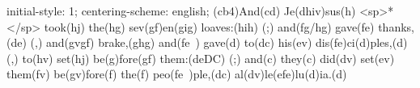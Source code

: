 initial-style: 1;
centering-scheme: english;
(cb4)And(cd) Je(dhiv)sus(h) <sp>*</sp> took(hj) the(hg) sev(gf)en(gig) loaves:(hih) (;) and(fg/hg) gave(fe) thanks,(de) (,) and(gvgf) brake,(ghg) and(fe~) gave(d) to(dc) his(ev) dis(fe)ci(d)ples,(d) (,) to(hv) set(hj) be(g)fore(gf) them:(deDC) (;) and(c) they(c) did(dv) set(ev) them(fv) be(gv)fore(f) the(f) peo(fe~)ple,(dc) al(dv)le(efe)lu(d)ia.(d)
